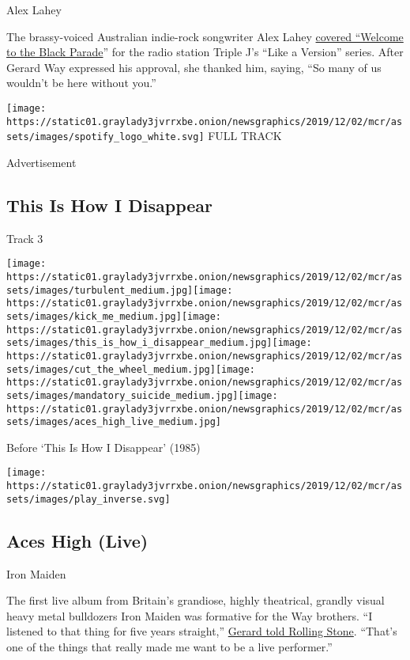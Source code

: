Alex Lahey

The brassy-voiced Australian indie-rock songwriter Alex Lahey
\href{https://www.youtube.com/watch?v=nC_k8j8YwjU}{covered ``Welcome to
the Black Parade}'' for the radio station Triple J's ``Like a Version''
series. After Gerard Way expressed his approval, she thanked him,
saying, ``So many of us wouldn't be here without you.''

\href{https://open.spotify.com/track/0dWcW3i3WWVle2LKMEvsMO?si=fraHWcbITQWbM9vDWsXvmw}{}

\texttt{[image: https://static01.graylady3jvrrxbe.onion/newsgraphics/2019/12/02/mcr/assets/images/spotify\_logo\_white.svg]}
FULL TRACK

Advertisement

\hypertarget{this-is-how-i-disappear}{%
\subsection{This Is How I Disappear}\label{this-is-how-i-disappear}}

Track 3

\texttt{[image: https://static01.graylady3jvrrxbe.onion/newsgraphics/2019/12/02/mcr/assets/images/turbulent\_medium.jpg]}\texttt{[image: https://static01.graylady3jvrrxbe.onion/newsgraphics/2019/12/02/mcr/assets/images/kick\_me\_medium.jpg]}\texttt{[image: https://static01.graylady3jvrrxbe.onion/newsgraphics/2019/12/02/mcr/assets/images/this\_is\_how\_i\_disappear\_medium.jpg]}\texttt{[image: https://static01.graylady3jvrrxbe.onion/newsgraphics/2019/12/02/mcr/assets/images/cut\_the\_wheel\_medium.jpg]}\texttt{[image: https://static01.graylady3jvrrxbe.onion/newsgraphics/2019/12/02/mcr/assets/images/mandatory\_suicide\_medium.jpg]}\texttt{[image: https://static01.graylady3jvrrxbe.onion/newsgraphics/2019/12/02/mcr/assets/images/aces\_high\_live\_medium.jpg]}

Before `This Is How I Disappear' (1985)

\texttt{[image: https://static01.graylady3jvrrxbe.onion/newsgraphics/2019/12/02/mcr/assets/images/play\_inverse.svg]}

\hypertarget{aces-high-live}{%
\subsection{Aces High (Live)}\label{aces-high-live}}

Iron Maiden

The first live album from Britain's grandiose, highly theatrical,
grandly visual heavy metal bulldozers Iron Maiden was formative for the
Way brothers. ``I listened to that thing for five years straight,''
\href{https://www.rollingstone.com/music/music-news/my-chemical-romances-gerard-way-the-six-pack-qa-118066/}{Gerard
told Rolling Stone}. ``That's one of the things that really made me want
to be a live performer.''

